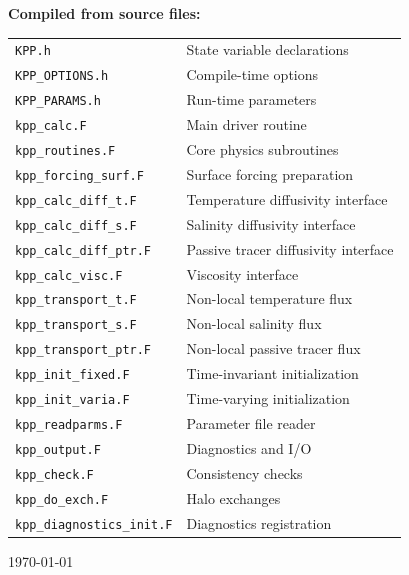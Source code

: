 \documentclass[12pt,letterpaper]{article}
\begin{document}
\begin{titlepage}
\begin{center}
{\large\textbf{Compiled from source files:}}\\[6pt]  
\begin{tabular}{ll}  
\texttt{KPP.h}                  & State variable declarations \\  
\texttt{KPP\_OPTIONS.h}          & Compile-time options \\  
\texttt{KPP\_PARAMS.h}           & Run-time parameters \\  
\texttt{kpp\_calc.F}             & Main driver routine \\  
\texttt{kpp\_routines.F}         & Core physics subroutines \\  
\texttt{kpp\_forcing\_surf.F}    & Surface forcing preparation \\  
\texttt{kpp\_calc\_diff\_t.F}    & Temperature diffusivity interface \\  
\texttt{kpp\_calc\_diff\_s.F}    & Salinity diffusivity interface \\  
\texttt{kpp\_calc\_diff\_ptr.F}  & Passive tracer diffusivity interface \\  
\texttt{kpp\_calc\_visc.F}       & Viscosity interface \\  
\texttt{kpp\_transport\_t.F}     & Non-local temperature flux \\  
\texttt{kpp\_transport\_s.F}     & Non-local salinity flux \\  
\texttt{kpp\_transport\_ptr.F}   & Non-local passive tracer flux \\  
\texttt{kpp\_init\_fixed.F}      & Time-invariant initialization \\  
\texttt{kpp\_init\_varia.F}      & Time-varying initialization \\  
\texttt{kpp\_readparms.F}        & Parameter file reader \\  
\texttt{kpp\_output.F}           & Diagnostics and I/O \\  
\texttt{kpp\_check.F}            & Consistency checks \\  
\texttt{kpp\_do\_exch.F}         & Halo exchanges \\  
\texttt{kpp\_diagnostics\_init.F}& Diagnostics registration \\  
\end{tabular}  
  
\vfill  
{\color{gray}\today}  
\end{center}  
\end{titlepage}  
  
\tableofcontents  
\newpage  
  
\end{document}
